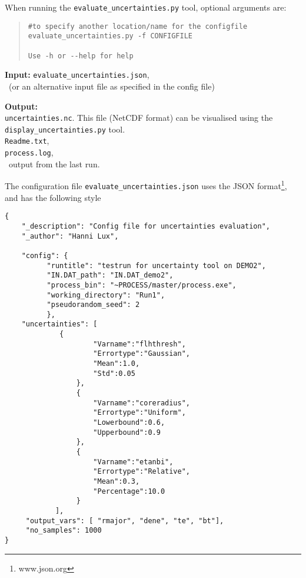 When running the \texttt{evaluate\_uncertainties.py} tool, optional arguments are:
\begin{quote}
\begin{verbatim}
#to specify another location/name for the configfile
evaluate_uncertainties.py -f CONFIGFILE

Use -h or --help for help
\end{verbatim}
\end{quote}



\begin{description}
\item{\textbf{Input:}} \texttt{evaluate\_uncertainties.json},\\
\indat\ (or an alternative input file as specified in the config file)
                                
\item{\textbf{Output:}} \\
\texttt{uncertainties.nc}. This file (NetCDF format) can be visualised using the \texttt{display\_uncertainties.py} tool. \\
\texttt{Readme.txt},\\
\texttt{process.log}, \\
\process\ output from the last run.

\end{description}
The configuration file \texttt{evaluate\_uncertainties.json} uses the JSON
format\footnote{www.json.org}, and has the following style
\begin{framed}
\begin{verbatim}
{
	"_description": "Config file for uncertainties evaluation",
	"_author": "Hanni Lux",
	
	"config": {
		  "runtitle": "testrun for uncertainty tool on DEMO2",
		  "IN.DAT_path": "IN.DAT_demo2",
		  "process_bin": "~PROCESS/master/process.exe",
		  "working_directory": "Run1",
		  "pseudorandom_seed": 2
		  },
	"uncertainties": [
		     {
               	     "Varname":"flhthresh",
               	     "Errortype":"Gaussian",
               	     "Mean":1.0,
               	     "Std":0.05
          	     },          
          	     {
               	     "Varname":"coreradius",
               	     "Errortype":"Uniform",
               	     "Lowerbound":0.6,
               	     "Upperbound":0.9
          	     },
          	     {
               	     "Varname":"etanbi",
               	     "Errortype":"Relative",
               	     "Mean":0.3,
               	     "Percentage":10.0
          	     } 
	     	],
     "output_vars": [ "rmajor", "dene", "te", "bt"],
     "no_samples": 1000    
}
\end{verbatim}
\end{framed}
